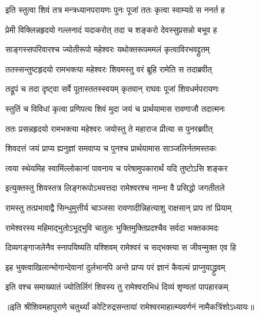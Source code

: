 \twolineshloka
{इति स्तुत्वा शिवं तत्र मन्त्रध्यानपरायणः}
{पुनः पूजां ततः कृत्वा स्वाम्यग्रे स ननर्त ह} %

\twolineshloka
{प्रेमी विक्लिन्नहृदयो गल्लनादं यदाकरोत्} 
{तदा च शङ्करो देवस्सुप्रसन्नो बभूव ह} %

\twolineshloka
{साङ्गस्सपरिवारश्च ज्योतीरूपो महेश्वरः}
{यथोक्तरूपममलं कृत्वाविरभवद्द्रुतम्} %

\twolineshloka
{ततस्सन्तुष्टहृदयो रामभक्त्या महेश्वरः} 
{शिवमस्तु वरं ब्रूहि रामेति स तदाब्रवीत्} %

\twolineshloka
{तद्रूपं च तदा दृष्ट्वा सर्वे पूतास्ततस्स्वयम्} 
{कृतवान् राघवः पूजां शिवधर्मपरायणः} %

\twolineshloka
{स्तुतिं च विविधां कृत्वा प्रणिपत्य शिवं मुदा} 
{जयं च प्रार्थयामास रावणाजौ तदात्मनः} %

\twolineshloka
{ततः प्रसन्नहृदयो रामभक्त्या महेश्वरः} 
{जयोस्तु ते महाराज प्रीत्या स पुनरब्रवीत्} %

\twolineshloka
{शिवदत्तं जयं प्राप्य ह्यनुज्ञां समवाप्य च} 
{पुनश्च प्रार्थयामास साञ्जलिर्नतमस्तकः} %


\twolineshloka
{त्वया स्थेयमिह स्वामिंल्लोकानां पावनाय च} 
{परेषामुपकारार्थं यदि तुष्टोऽसि शङ्कर} %


\twolineshloka
{इत्युक्तस्तु शिवस्तत्र लिङ्गरूपोऽभवत्तदा} 
{रामेश्वरश्च नाम्ना वै प्रसिद्धो जगतीतले} %

\twolineshloka
{रामस्तु तत्प्रभावाद्वै सिन्धुमुत्तीर्य चाञ्जसा}
{रावणादीन्निहत्याशु राक्षसान् प्राप तां प्रियाम्} %

\twolineshloka
{रामेश्वरस्य महिमाद्भुतोऽभूद्भुवि चातुलः} 
{भुक्तिमुक्तिप्रदश्चैव सर्वदा भक्तकामदः} %

\twolineshloka
{दिव्यगङ्गाजलेनैव स्नापयिष्यति यश्शिवम्} 
{रामेश्वरं च सद्भक्त्या स जीवन्मुक्त एव हि} %

\twolineshloka
{इह भुक्त्वाखिलान्भोगान्देवानां दुर्लभानपि} 
{अन्ते प्राप्य परं ज्ञानं कैवल्यं प्राप्नुयाद्ध्रुवम्} %

\twolineshloka
{इति वश्च समाख्यातं ज्योतिर्लिगं शिवस्य तु}
{रामेश्वराभिधं दिव्यं शृण्वतां पापहारकम्} %

॥इति श्रीशिवमहापुराणे चतुर्थ्यां कोटिरुद्रसन्तायां रामेश्वरमाहात्म्यवर्णनं नामैकत्रिंशोऽध्यायः॥

\closesection